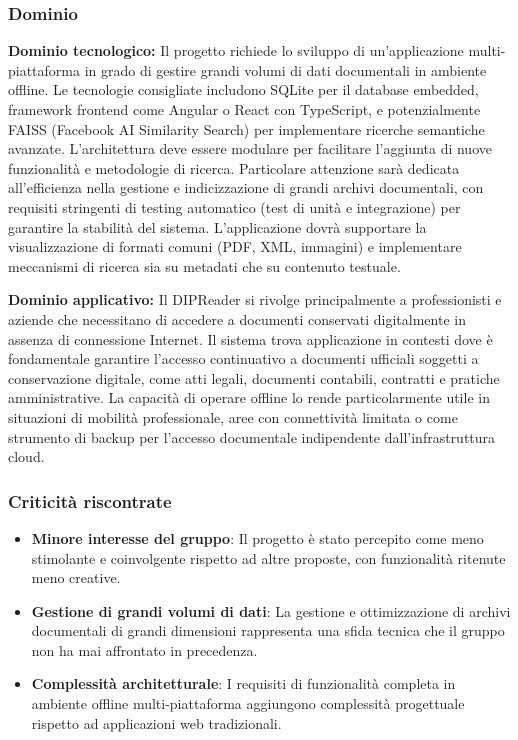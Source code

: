 \documentclass[11pt,a4paper]{article}
\begin{document}
\subsubsection{Dominio}
\textbf{Dominio tecnologico:} Il progetto richiede lo sviluppo di un'applicazione multi-piattaforma in grado di gestire grandi volumi di dati documentali in ambiente offline. Le tecnologie consigliate includono SQLite per il database embedded, framework frontend come Angular o React con TypeScript, e potenzialmente FAISS (Facebook AI Similarity Search) per implementare ricerche semantiche avanzate. L'architettura deve essere modulare per facilitare l'aggiunta di nuove funzionalità e metodologie di ricerca. Particolare attenzione sarà dedicata all'efficienza nella gestione e indicizzazione di grandi archivi documentali, con requisiti stringenti di testing automatico (test di unità e integrazione) per garantire la stabilità del sistema. L'applicazione dovrà supportare la visualizzazione di formati comuni (PDF, XML, immagini) e implementare meccanismi di ricerca sia su metadati che su contenuto testuale.

\vspace{0.5cm}

\noindent  \textbf{Dominio applicativo:} Il DIPReader si rivolge principalmente a professionisti e aziende che necessitano di accedere a documenti conservati digitalmente in assenza di connessione Internet. Il sistema trova applicazione in contesti dove è fondamentale garantire l'accesso continuativo a documenti ufficiali soggetti a conservazione digitale, come atti legali, documenti contabili, contratti e pratiche amministrative. La capacità di operare offline lo rende particolarmente utile in situazioni di mobilità professionale, aree con connettività limitata o come strumento di backup per l'accesso documentale indipendente dall'infrastruttura cloud.

\subsubsection{Criticità riscontrate}
\begin{itemize}
    \item \textbf{Minore interesse del gruppo}: Il progetto è stato percepito come meno stimolante e coinvolgente rispetto ad altre proposte, con funzionalità ritenute meno creative.
    \item \textbf{Gestione di grandi volumi di dati}: La gestione e ottimizzazione di archivi documentali di grandi dimensioni rappresenta una sfida tecnica che il gruppo non ha mai affrontato in precedenza.
    \item \textbf{Complessità architetturale}: I requisiti di funzionalità completa in ambiente offline multi-piattaforma aggiungono complessità progettuale rispetto ad applicazioni web tradizionali.
\end{itemize}
\end{document}
